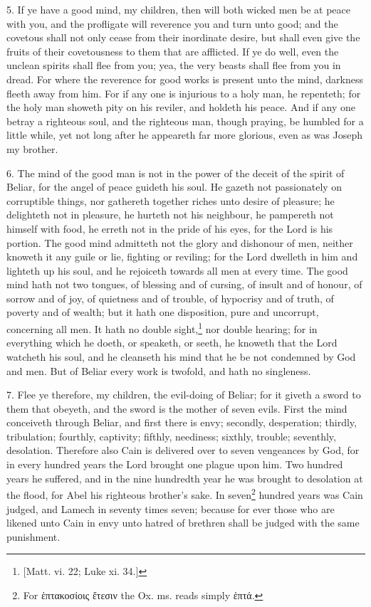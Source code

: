 5. If ye have a good mind, my children, then will both wicked men be at peace with you, and the profligate will reverence you and turn unto good; and the covetous shall not only cease from their inordinate desire, but shall even give the fruits of their covetousness to them that are afflicted. If ye do well, even the unclean spirits shall flee from you; yea, the very beasts shall flee from you in dread. For where the reverence for good works is present unto the mind, darkness fleeth away from him. For if any one is injurious to a holy man, he repenteth; for the holy man showeth pity on his reviler, and holdeth his peace. And if any one betray a righteous soul, and the righteous man, though praying, be humbled for a little while, yet not long after he appeareth far more glorious, even as was Joseph my brother.

6. The mind of the good man is not in the power of the deceit of the spirit of Beliar, for the angel of peace guideth his soul. He gazeth not passionately on corruptible things, nor gathereth together riches unto desire of pleasure; he delighteth not in pleasure, he hurteth not his neighbour, he pampereth not himself with food, he erreth not in the pride of his eyes, for the Lord is his portion. The good mind admitteth not the glory and dishonour of men, neither knoweth it any guile or lie, fighting or reviling; for the Lord dwelleth in him and lighteth up his soul, and he rejoiceth towards all men at every time. The good mind hath not two tongues, of blessing and of cursing, of insult and of honour, of sorrow and of joy, of quietness and of trouble, of hypocrisy and of truth, of poverty and of wealth; but it hath one disposition, pure and uncorrupt, concerning all men. It hath no double sight,\footnote{[Matt. vi. 22; Luke xi. 34.]} nor double hearing; for in everything which he doeth, or speaketh, or seeth, he knoweth that the Lord watcheth his soul, and he cleanseth his mind that he be not condemned by God and men. But of Beliar every work is twofold, and hath no singleness.

7. Flee ye therefore, my children, the evil-doing of Beliar; for it giveth a sword to them that obeyeth, and the sword is the mother of seven evils. First the mind conceiveth through Beliar, and first there is envy; secondly, desperation; thirdly, tribulation; fourthly, captivity; fifthly, neediness; sixthly, trouble; seventhly, desolation. Therefore also Cain is delivered over to seven vengeances by God, for in every hundred years the Lord brought one plague upon him. Two hundred years he suffered, and in the nine hundredth year he was brought to desolation at the flood, for Abel his righteous brother’s sake. In seven\footnote{For \textgreek{ἑπτακοσίοις ἔτεσιν} the Ox. ms. reads simply \textgreek{ἑπτά}.} hundred years was Cain judged, and Lamech in seventy times seven; because for ever those who are likened unto Cain in envy unto hatred of brethren shall be judged with the same punishment.

